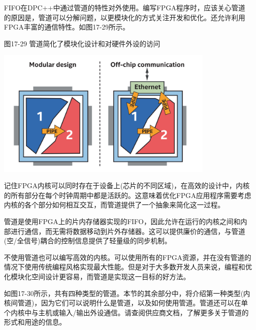 FIFO在DPC++中通过管道的特性对外使用。编写FPGA程序时，应该关心管道的原因是，管道可以分解问题，以更模块化的方式关注开发和优化。还允许利用FPGA丰富的通信特性。如图17-29所示。\par

\hspace*{\fill} \par %
图17-29 管道简化了模块化设计和对硬件外设的访问
\begin{center}
	\includegraphics[width=0.8\textwidth]{content/chapter-17/images/24}
\end{center}

记住FPGA内核可以同时存在于设备上(芯片的不同区域)，在高效的设计中，内核的所有部分在每个时钟周期中都是活跃的。这意味着优化FPGA应用程序需要考虑内核的各个部分如何相互交互，而管道提供了一个抽象来简化这一过程。\par

管道是使用FPGA上的片内存储器实现的FIFO，因此允许在运行的内核之间和内部进行通信，而无需将数据移动到片外存储器。这可以提供廉价的通信，与管道(空/全信号)耦合的控制信息提供了轻量级的同步机制。\par

\begin{tcolorbox}[colback=blue!5!white,colframe=blue!75!black, title=我们需要管道吗?]
不使用管道也可以编写高效的内核。可以使用所有的FPGA资源，并在没有管道的情况下使用传统编程风格实现最大性能。但是对于大多数开发人员来说，编程和优化模块化空间设计更容易，而管道是实现这一目标的好方法。
\end{tcolorbox}

如图17-30所示，共有四种类型的管道。本节的其余部分中，将介绍第一种类型(内核间管道)，因为它们可以说明什么是管道，以及如何使用管道。管道还可以在单个内核中与主机或输入/输出外设通信。请查阅供应商文档，了解更多关于管道的形式和用途的信息。\par

